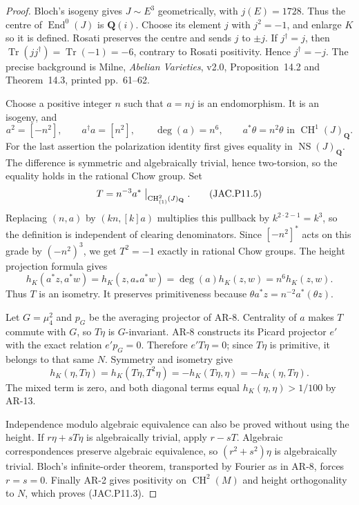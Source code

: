 \begin{proof}
Bloch's isogeny gives $J\sim E^3$ geometrically, with $j(E)=1728$.
Thus the centre of $\operatorname{End}^0(J)$ is $\mathbf Q(i)$.
Choose its element $j$ with $j^2=-1$, and enlarge $K$ so it is
defined. Rosati preserves the centre and sends $j$ to $\pm j$.
If $j^\dagger=j$, then
$\operatorname{Tr}(j j^\dagger)=\operatorname{Tr}(-1)=-6$,
contrary to Rosati positivity. Hence $j^\dagger=-j$.
The precise background is Milne, \emph{Abelian Varieties}, v2.0,
Proposition~14.2 and Theorem~14.3, printed pp.~61--62.

Choose a positive integer $n$ such that $a=nj$ is an endomorphism.
It is an isogeny, and
\[
 a^2=[-n^2],\qquad a^\dagger a=[n^2],\qquad
 \deg(a)=n^6,\qquad a^*\theta=n^2\theta
     \text{ in }\operatorname{CH}^1(J)_{\mathbf Q}.     \tag{JAC.P11.4}
\]
For the last assertion the polarization identity first gives
equality in $\operatorname{NS}(J)_{\mathbf Q}$. The difference is
symmetric and algebraically trivial, hence two-torsion, so the
equality holds in the rational Chow group.
Set
\[
 T=n^{-3}a^*\bigm|_{\operatorname{CH}^2_{(1)}(J)_{\mathbf Q}}.
                                                        \tag{JAC.P11.5}
\]
Replacing $(n,a)$ by $(kn,[k]a)$ multiplies this pullback by
$k^{2\cdot2-1}=k^3$, so the definition is independent of clearing
denominators. Since $[-n^2]^*$ acts on this grade by
$(-n^2)^3$, we get $T^2=-1$ exactly in rational Chow groups.
The height projection formula gives
\[
 h_K(a^*z,a^*w)=h_K(z,a_*a^*w)=\deg(a)h_K(z,w)
              =n^6h_K(z,w).
\]
Thus $T$ is an isometry. It preserves primitiveness because
$\theta a^*z=n^{-2}a^*(\theta z)$.

Let $G=\mu_4^2$ and $p_G$ be the averaging projector of AR-8.
Centrality of $a$ makes $T$ commute with $G$, so $T\eta$ is
$G$-invariant. AR-8 constructs its Picard projector $e'$ with
the exact relation $e'p_G=0$. Therefore $e'T\eta=0$; since $T\eta$
is primitive, it belongs to that same $N$.
Symmetry and isometry give
\[
 h_K(\eta,T\eta)=h_K(T\eta,T^2\eta)
               =-h_K(T\eta,\eta)=-h_K(\eta,T\eta).
\]
The mixed term is zero, and both diagonal terms equal
$h_K(\eta,\eta)>1/100$ by AR-13.

Independence modulo algebraic equivalence can also be proved
without using the height. If $r\eta+sT\eta$ is algebraically
trivial, apply $r-sT$. Algebraic correspondences preserve
algebraic equivalence, so $(r^2+s^2)\eta$ is algebraically trivial.
Bloch's infinite-order theorem, transported by Fourier as in AR-8,
forces $r=s=0$. Finally AR-2 gives positivity on
$\operatorname{CH}^2(M)$ and height orthogonality to $N$,
which proves (JAC.P11.3).
\end{proof}

